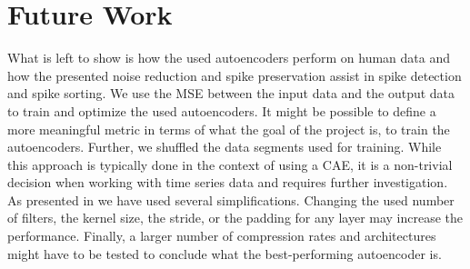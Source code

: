 \section{Future Work}
What is left to show is how the used autoencoders perform on human data and how the presented noise reduction and spike preservation assist in spike detection and spike sorting.
We use the MSE between the input data and the output data to train and optimize the used autoencoders. 
It might be possible to define a more meaningful metric in terms of what the goal of the project is, to train the autoencoders.
Further, we shuffled the data segments used for training. 
While this approach is typically done in the context of using a CAE, it is a non-trivial decision when working with time series data and requires further investigation.
As presented in  we have used several simplifications.
Changing the used number of filters, the kernel size, the stride, or the padding for any layer may increase the performance.
Finally, a larger number of compression rates and architectures might have to be tested to conclude what the best-performing autoencoder is.